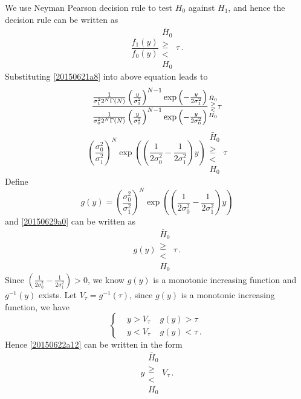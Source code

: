 We use Neyman Pearson decision rule to test $H_0$ against $H_1$, and hence the decision rule can be written as
\begin{equation}
  \frac{f_1(y)}{f_0(y)} \substack{\bar{H}_0 \\ \geq \\ < \\ H_0} \tau\,.
\end{equation}
Substituting \eqref{20150621a8} into above equation leads to 
\begin{equation}
  \frac{\CHISQUY[\sigma_1^2]}{\CHISQUY[\sigma_0^2]}\substack{\bar{H}_0 \\ \geq \\ < \\ H_0} \tau
\end{equation}
\begin{equation}
  \left(\frac{\sigma_0^2}{\sigma_1^2}\right)^N\exp\left( (\frac{1}{2\sigma_0^2} -  \frac{1}{2\sigma_1^2}  )y \right)\substack{\bar{H}_0 \\ \geq \\ < \\ H_0} \tau
\end{equation}
Define 
\begin{equation}
  g(y) = \left(\frac{\sigma_0^2}{\sigma_1^2}\right)^N\exp\left( (\frac{1}{2\sigma_0^2} -  \frac{1}{2\sigma_1^2}  )y \right)
  \label{20150629a0}
\end{equation}
and \eqref{20150629a0} can be written as
\begin{equation}
  g(y) \substack{\bar{H}_0 \\ \geq \\ < \\ H_0} \tau\,.
  \label{20150622a12}
\end{equation}
Since $(\frac{1}{2\sigma_0^2} -  \frac{1}{2\sigma_1^2}  ) >  0$, we know $g(y)$ is a monotonic increasing function and $g^{-1}(y) $ exists.  
Let $V_\tau = g^{-1}(\tau)$, since $g(y)$ is a monotonic increasing function, we have 
\begin{equation}
  \begin{cases}
    &y > V_\tau\;\;\;\;g(y) > \tau\\
    &y < V_\tau\;\;\;\;g(y) < \tau\,.
  \end{cases}
\end{equation}
Hence \eqref{20150622a12} can be written in the form 
\begin{equation}
  y  \substack{\bar{H}_0 \\ \geq \\ < \\ H_0} V_\tau\,.
  \label{20150622a22}
\end{equation}
